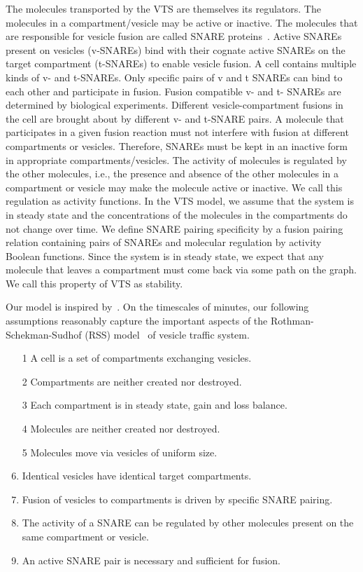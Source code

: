 The molecules transported by the VTS are themselves its regulators. The molecules in a
compartment/vesicle may be active or inactive. The molecules that are responsible for vesicle fusion
are called SNARE proteins~\cite{jahn2006snares, wickner2008membrane}. Active SNAREs present on vesicles (v-SNAREs) bind with their
cognate active SNAREs on the target compartment (t-SNAREs) to enable vesicle fusion. A cell
contains multiple kinds of v- and t-SNAREs. Only specific pairs of v and t SNAREs can bind to
each other and participate in fusion. Fusion compatible v- and t- SNAREs are determined by
biological experiments. Different vesicle-compartment fusions in the cell are brought about by
different v- and t-SNARE pairs. A molecule that participates in a given fusion reaction must not
interfere with fusion at different compartments or vesicles. Therefore, SNAREs must be kept in an
inactive form in appropriate compartments/vesicles. The activity of molecules is regulated by the
other molecules, i.e., the presence and absence of the other molecules in a compartment or vesicle
may make the molecule active or inactive. We call this regulation as activity functions.
In the VTS model, we assume that the system is in steady state and the concentrations of the
molecules in the compartments do not change over time. We define SNARE pairing specificity by a
fusion pairing relation containing pairs of SNAREs and molecular regulation by activity Boolean
functions. Since the system is in steady state, we expect that any molecule that leaves a
compartment must come back via some path on the graph. We call this property of VTS as stability.

Our model is inspired by~\cite{shukla2017discovering}. On the timescales of minutes, our following assumptions reasonably capture the important aspects of the Rothman-Schekman-Sudhof (RSS) model~\cite{rothman2002machinery} of vesicle traffic system.
\begin{enumerate}
\item[1] A cell is a set of compartments exchanging vesicles.
\item[2] Compartments are neither created nor destroyed.
\item[3] Each compartment is in steady state, gain and loss balance.
\item[4] Molecules are neither created nor destroyed.
\item[5] Molecules move via vesicles of uniform size.
\item Identical vesicles have identical target compartments.
\item Fusion of vesicles to compartments is driven by specific SNARE pairing.
\item The activity of a SNARE can be regulated by other molecules present on the same compartment
or vesicle.
\item An active SNARE pair is necessary and sufficient for fusion. 
\end{enumerate}
 
